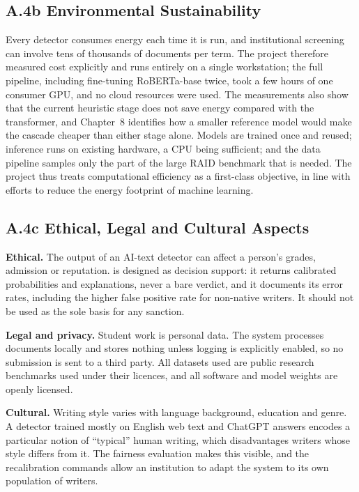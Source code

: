 \subsection*{A.4b Environmental Sustainability}

Every detector consumes energy each time it is run, and institutional screening
can involve tens of thousands of documents per term. The project therefore
measured cost explicitly and runs entirely on a single workstation; the full
pipeline, including fine-tuning RoBERTa-base twice, took a few hours of one
consumer GPU, and no cloud resources were used. The measurements also show that
the current heuristic stage does not save energy compared with the transformer,
and Chapter~8 identifies how a smaller reference model would make the cascade
cheaper than either stage alone. Models are trained once and reused; inference
runs on existing hardware, a CPU being sufficient; and the data pipeline
samples only the part of the large RAID benchmark that is needed. The project
thus treats computational efficiency as a first-class objective, in line with
efforts to reduce the energy footprint of machine learning.

\subsection*{A.4c Ethical, Legal and Cultural Aspects}

\textbf{Ethical.} The output of an AI-text detector can affect a person's grades,
admission or reputation. \veriscript{} is designed as decision support: it
returns calibrated probabilities and explanations, never a bare verdict, and it
documents its error rates, including the higher false positive rate for
non-native writers. It should not be used as the sole basis for any sanction.

\textbf{Legal and privacy.} Student work is personal data. The system processes
documents locally and stores nothing unless logging is explicitly enabled, so
no submission is sent to a third party. All datasets used are public research
benchmarks used under their licences, and all software and model weights are
openly licensed.

\textbf{Cultural.} Writing style varies with language background, education and
genre. A detector trained mostly on English web text and ChatGPT answers
encodes a particular notion of ``typical'' human writing, which disadvantages
writers whose style differs from it. The fairness evaluation makes this visible,
and the recalibration commands allow an institution to adapt the system to its
own population of writers.

